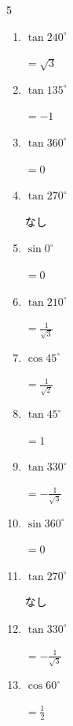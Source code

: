 \begin{multicols}{5}
\begin{enumerate}
        $\displaystyle =-\frac{1}{\sqrt{2}}$

  \item $\displaystyle \tan{240^\circ}$

        $\displaystyle =\sqrt{3}$

  \item $\displaystyle \tan{135^\circ}$

        $\displaystyle =-1$

  \item $\displaystyle \tan{360^\circ}$

        $\displaystyle =0$

  \item $\displaystyle \tan{270^\circ}$

        $\displaystyle なし$

  \item $\displaystyle \sin{0^\circ}$

        $\displaystyle =0$

  \item $\displaystyle \tan{210^\circ}$

        $\displaystyle =\frac{1}{\sqrt{3}}$

  \item $\displaystyle \cos{45^\circ}$

        $\displaystyle =\frac{1}{\sqrt{2}}$

  \item $\displaystyle \tan{45^\circ}$

        $\displaystyle =1$

  \item $\displaystyle \tan{330^\circ}$

        $\displaystyle =-\frac{1}{\sqrt{3}}$

  \item $\displaystyle \sin{360^\circ}$

        $\displaystyle =0$

  \item $\displaystyle \tan{270^\circ}$

        $\displaystyle なし$

  \item $\displaystyle \tan{330^\circ}$

        $\displaystyle =-\frac{1}{\sqrt{3}}$

  \item $\displaystyle \cos{60^\circ}$

        $\displaystyle =\frac{1}{2}$


\end{enumerate}
\end{multicols}
